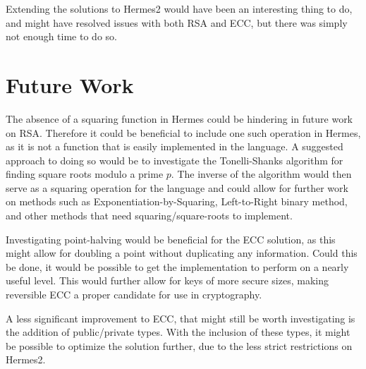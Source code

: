 Extending the solutions to Hermes2 would have been an interesting thing to do, and might have resolved issues with both RSA and ECC, but there was simply not enough time to do so.





\section{Future Work}
\label{Future}
The absence of a squaring function in Hermes could be hindering in future work on RSA. Therefore it could be beneficial to include one such operation in Hermes, as it is not a function that is easily implemented in the language. A suggested approach to doing so would be to investigate the Tonelli-Shanks algorithm for finding square roots modulo a prime $p$. The inverse of the algorithm would then serve as a squaring operation for the language and could allow for further work on methods such as Exponentiation-by-Squaring, Left-to-Right binary method, and other methods that need squaring/square-roots to implement.

Investigating point-halving would be beneficial for the ECC solution, as this might allow for doubling a point without duplicating any information. Could this be done, it would be possible to get the implementation to perform on a nearly useful level. This would further allow for keys of more secure sizes, making reversible ECC a proper candidate for use in cryptography.

A less significant improvement to ECC, that might still be worth investigating is the addition of public/private types. With the inclusion of these types, it might be possible to optimize the solution further, due to the less strict restrictions on Hermes2. 